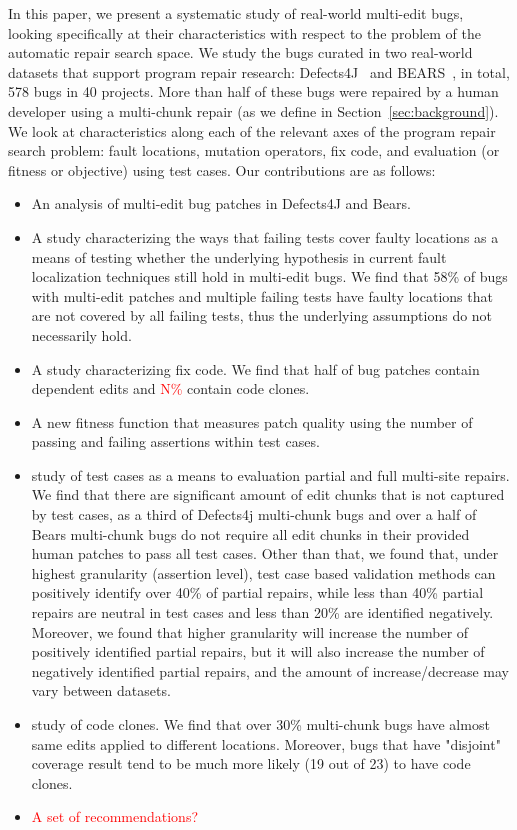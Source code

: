 \documentclass[sigconf, timestamp-false, anonymous=true]{acmart}
\newcommand\todo[1]{\textcolor{red}{#1}}
\begin{document}
In this paper, we present a systematic study of real-world multi-edit bugs,
looking specifically at their characteristics with respect to the problem of the
automatic repair search space.  
We study the bugs curated in two
real-world datasets that support program repair research: Defects4J~\cite{defects4j}
and BEARS~\cite{bears}, in total, 578 bugs in 40 projects. 
More than half of these bugs were repaired by a
human developer using a multi-chunk repair (as we define in
Section~\ref{sec:background}).  We look at characteristics along each of the
relevant axes of the program repair search problem: fault locations, mutation
operators, fix code, and evaluation (or fitness or objective) using test cases.  Our 
contributions are
as follows:

\begin{itemize}
\item An analysis of multi-edit bug patches in Defects4J and Bears.
\item A study characterizing the ways that failing tests cover faulty locations as a means of 
testing whether the underlying hypothesis in current fault localization techniques still hold 
in multi-edit bugs. We find that 58\% of 
bugs with multi-edit patches and multiple failing tests have faulty locations that are not 
covered by all failing tests, thus the underlying assumptions do not necessarily hold.
\item A study characterizing fix code.  We find that half of 
bug patches contain dependent edits and \todo{N\%} contain 
code clones.
\item A new fitness function that measures patch quality using the number of 
	passing and failing assertions within test cases.
\item study of test cases as a means to evaluation partial and full
  multi-site repairs.  We find that there are significant amount of edit chunks that
  is not captured by test cases, as a third of Defects4j multi-chunk bugs and over a half of 
  Bears multi-chunk bugs do not require all edit chunks in their provided human patches to
  pass all test cases. Other than that, we found that, under highest granularity (assertion level), test case
  based validation methods can positively identify over 40\% of partial repairs, 
  while less than 40\% partial repairs are neutral in test cases and less than 20\% are identified
  negatively. Moreover, we found that higher granularity will increase the number of
  positively identified partial repairs, but it will also increase the number of negatively 
  identified partial repairs, and the amount of increase/decrease may vary between
  datasets.
\item  study of code clones. We find that over 30\% multi-chunk bugs
  have almost same edits applied to different locations. Moreover, bugs that have 
  "disjoint" coverage result tend to be much more likely (19 out of 23) to have
  code clones.
\item \todo{A set of recommendations?}
\end{itemize}
\end{document}
